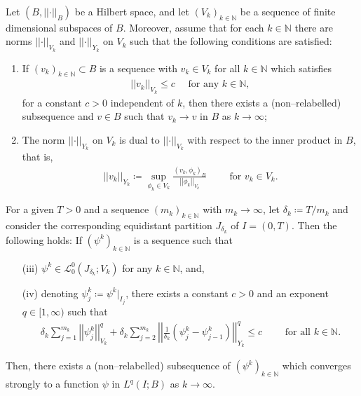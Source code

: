 \documentclass[reqno,a4paper]{amsart}
\def\norm#1{\left|\!\left| #1 \right|\!\right|}
\begin{document}
\begin{lemma}\label{lem:d-AL-0}
	Let $(B,\norm{\cdot}_B)$ be a Hilbert space, and let $(V_k)_{k \in \mathbb{N}}$ be a sequence of finite dimensional subspaces of $B$. 
	Moreover, assume that for each $k \in \mathbb{N}$ there are norms $\norm{\cdot}_{V_k}$ and $\norm{\cdot}_{Y_k}$ on $V_k$ such that the following conditions are satisfied: 	 
	\begin{enumerate}[label = (\roman*)]
		\item \label{itm:norm-Xk-0}
		If $(v_k)_{k \in \mathbb{N}}\subset B$ is a sequence with $v_k \in V_k$ for all $k \in \mathbb{N}$ which satisfies 
		\begin{align*}
			\norm{v_k}_{V_k} \leq c \quad \text{ for any } k \in \mathbb{N},
		\end{align*} 
		for a constant $c>0$ independent of $k$, then there exists a (non--relabelled) subsequence 
		{and $v\in B$} such that $v_k \to v$ in $B$ as $k \to \infty$;
		\item \label{itm:norm-Yk-0} The norm $\norm{\cdot}_{Y_k}$  on $V_k$ is dual to $\norm{\cdot}_{V_k}$
		with respect to the inner product in $B$, that is, 
		\begin{align*}
			\norm{v_k}_{Y_k} \coloneqq \sup_{\phi_k \in V_k} \frac{(v_k,\phi_k)_B}{\norm{\phi_k}_{V_k}} \qquad \text{  for }v_k \in V_k.
		\end{align*}	
	\end{enumerate}	
	For a given $T>0$ and a sequence $(m_k)_{k \in \mathbb{N}}$ with $m_k \to \infty$, 
	let $\delta_k \coloneqq T/m_k$ and consider the corresponding equidistant partition $J_{\delta_k}$ of $I = (0,T)$. Then the following holds: If $(\psi^{k})_{k\in\mathbb{N}}$ is a sequence such that 
	\begin{itemize}
		\item[(iii)] $\psi^k \in \mathcal{L}^0_0(J_{\delta_k};V_k)$ for any $k \in \mathbb{N}$, and, 
		\item[(iv)] denoting $\psi^k_j \coloneqq \psi^k|_{I_j}$, there exists a constant $c>0$ and an exponent $q \in [1,\infty)$ such that 
		\begin{align}\label{est:d-Aubin-Lions}
			\delta_k \sum_{{j = 1}}^{m_k} \norm{\psi_j^k}^q_{V_k} + \delta_k \sum_{{j = 2}}^{m_k} \norm{\frac{1}{\delta_k}(\psi^k_j -\psi^k_{j-1})}_{Y_k}^q
			\leq c \qquad \text{ for all } k \in \mathbb{N}. 
		\end{align}
	\end{itemize}
	Then, there exists a (non--relabelled) subsequence of $(\psi^k)_{k \in \mathbb{N}}$ which converges strongly to a function $\psi$ in $L^q(I;B)$ as $k \to \infty$. 
\end{lemma}
\end{document}
